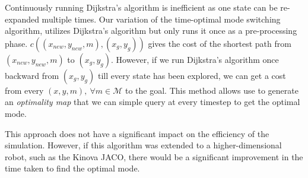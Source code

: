 Continuously running Dijkstra's algorithm is inefficient as one state can be re-expanded multiple times. Our variation of the time-optimal mode switching algorithm, utilizes Dijkstra's algorithm but only runs it once as a pre-processing phase. $c((x_{new}, y_{new}, m),(x_g, y_g))$ gives the cost of the shortest path from $(x_{new}, y_{new}, m)$ to $(x_g, y_g)$. However, if we run Dijkstra's algorithm once backward from $(x_g, y_g)$ till every state has been explored, we can get a cost from every $(x, y, m),~\forall m\in \mathcal{M}$ to the goal. This method allows use to generate an \textit{optimality map} that we can simple query at every timestep to get the optimal mode. 

This approach does not have a significant impact on the efficiency of the simulation. However, if this algorithm was extended to a higher-dimensional robot, such as the Kinova JACO, there would be a significant improvement in the time taken to find the optimal mode. 